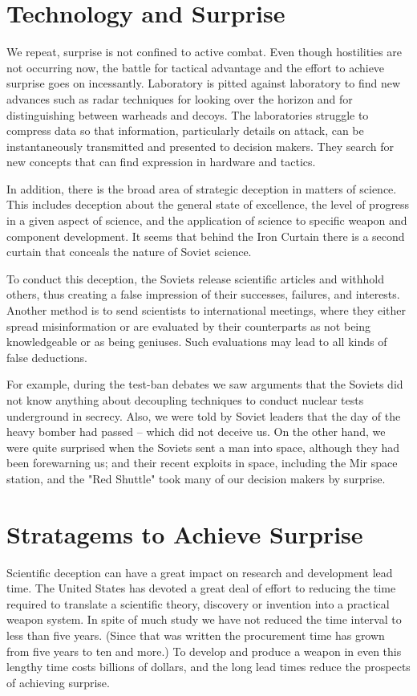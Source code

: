 \section{Technology and Surprise}
We repeat, surprise is not confined to active combat. Even though hostilities are not occurring now, the battle for tactical advantage and the effort to achieve surprise goes on incessantly. Laboratory is pitted against laboratory to find new advances such as radar techniques for looking over the horizon and for distinguishing between warheads and decoys. The laboratories struggle to compress data so that information, particularly details on attack, can be instantaneously transmitted and presented to decision makers. They search for new concepts that can find expression in hardware and tactics.

In addition, there is the broad area of strategic deception in matters of science. This includes deception about the general state of excellence, the level of progress in a given aspect of science, and the application of science to specific weapon and component development. It seems that behind the Iron Curtain there is a second curtain that conceals the nature of Soviet science.

To conduct this deception, the Soviets release scientific articles and withhold others, thus creating a false impression of their successes, failures, and interests. Another method is to send scientists to international meetings, where they either spread misinformation or are evaluated by their counterparts as not being knowledgeable or as being geniuses. Such evaluations may lead to all kinds of false deductions.

For example, during the test-ban debates we saw arguments that the Soviets did not know anything about decoupling techniques to conduct nuclear tests underground in secrecy. Also, we were told by Soviet leaders that the day of the heavy bomber had passed -- which did not deceive us. On the other hand, we were quite surprised when the Soviets sent a man into space, although they had been forewarning us; and their recent exploits in space, including the Mir space station, and the "Red Shuttle" took many of our decision makers by surprise.

\section{Stratagems to Achieve Surprise}
Scientific deception can have a great impact on research and development lead time. The United States has devoted a great deal of effort to reducing the time required to translate a scientific theory, discovery or invention into a practical weapon system. In spite of much study we have not reduced the time interval to less than five years. (Since that was written the procurement time has grown from five years to ten and more.) To develop and produce a weapon in even this lengthy time costs billions of dollars, and the long lead times reduce the prospects of achieving surprise.

